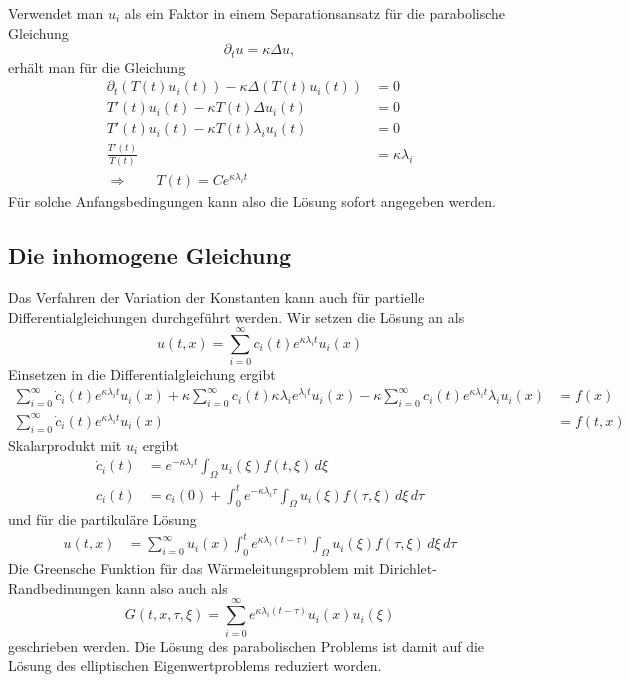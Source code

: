 Verwendet man $u_i$ als ein Faktor in einem Separationsansatz für
die parabolische Gleichung
\[
\partial_tu=\kappa\Delta u,
\]
erhält man für die Gleichung
\begin{align*}
\partial_t (T(t)u_i(t))-\kappa\Delta(T(t)u_i(t))&=0
\\
T'(t)u_i(t)-\kappa T(t)\Delta u_i(t)&=0
\\
T'(t)u_i(t)-\kappa T(t)\lambda_i u_i(t)&=0
\\
\frac{T'(t)}{T(t)}&=\kappa\lambda_i
\\
\Rightarrow\qquad T(t)=Ce^{\kappa\lambda_it}
\end{align*}
Für solche Anfangsbedingungen kann also die Lösung sofort angegeben
werden.
\subsection{Die inhomogene Gleichung}
Das Verfahren der Variation der Konstanten kann auch für partielle
Differentialgleichungen durchgeführt werden. Wir setzen die Lösung
an als
\[
u(t,x)=\sum_{i=0}^\infty c_i(t) e^{\kappa\lambda_i t}u_i(x)
\]
Einsetzen in die Differentialgleichung ergibt
\begin{align*}
\sum_{i=0}^\infty \dot c_i(t)e^{\kappa\lambda_it}u_i(x)
+\kappa\sum_{i=0}^\infty c_i(t)\kappa\lambda_i e^{\lambda_it}u_i(x)
-\kappa\sum_{i=0}^\infty c_i(t)e^{\kappa\lambda_it}\lambda_iu_i(x)
&=f(x)
\\
\sum_{i=0}^\infty \dot c_i(t)e^{\kappa\lambda_it}u_i(x)
&=f(t,x)
\end{align*}
Skalarprodukt mit $u_i$ ergibt
\begin{align*}
\dot c_i(t)&= e^{-\kappa\lambda_it}\int_{\Omega}u_i(\xi)f(t,\xi)\,d\xi
\\
c_i(t)&=c_i(0)+\int_0^te^{-\kappa\lambda_i\tau}\int_{\Omega}u_i(\xi)f(\tau,\xi)\,d\xi\,d\tau
\end{align*}
und für die partikuläre Lösung
\begin{align*}
u(t,x)&=
\sum_{i=0}^\infty
u_i(x)
\int_0^t
e^{\kappa\lambda_i(t-\tau)}\int_{\Omega}u_i(\xi)f(\tau,\xi)\,d\xi\,d\tau
\end{align*}
Die Greensche Funktion für das Wärmeleitungsproblem mit
Dirichlet-Randbedinungen kann also auch als
\[
G(t,x,\tau,\xi)
=
\sum_{i=0}^\infty
e^{\kappa\lambda_i (t-\tau)}
u_i(x)
u_i(\xi)
\]
geschrieben werden. Die Lösung des parabolischen Problems ist damit
auf die Lösung des elliptischen Eigenwertproblems reduziert worden.


